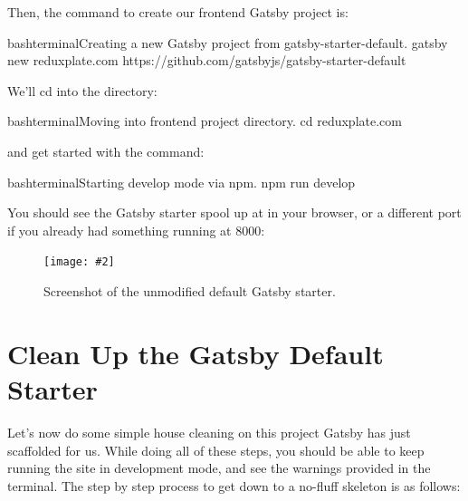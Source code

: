 \documentclass[paper=6in:9in,pagesize=pdftex,headinclude=on,footinclude=on,12pt,twoside]{scrbook}
\newcommand{\standardfigure}[3]{\begin{figure}[H]\begin{center}\texttt{[image: \#2]}\caption{#3}\label{fig:#2}\end{center}\end{figure}}
\begin{document}

Then, the command to create our frontend Gatsby project is:

\begin{codeInput}{bash}{terminal}{Creating a new Gatsby project from gatsby-starter-default.}
gatsby new reduxplate.com https://github.com/gatsbyjs/gatsby-starter-default
\end{codeInput}

We'll cd into the directory:

\begin{codeInput}{bash}{terminal}{Moving into frontend project directory.}
cd reduxplate.com
\end{codeInput}

and get started with the  command:

\begin{codeInput}{bash}{terminal}{Starting develop mode via npm.}
npm run develop
\end{codeInput}

You should see the Gatsby starter spool up at  in your browser, or a different port if you already had something running at 8000:

\standardfigure{\textwidth/2}{frontend/gatsby-starter}{Screenshot of the unmodified default Gatsby starter.}

\section{Clean Up the Gatsby Default Starter}

Let's now do some simple house cleaning on this project Gatsby has just scaffolded for us. While doing all of these steps, you should be able to keep running the site in development mode, and see the warnings provided in the terminal. The step by step process to get down to a no-fluff skeleton is as follows:
\end{document}
